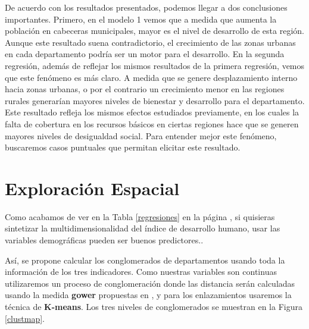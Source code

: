 \documentclass{article}
\begin{document}
De acuerdo con los resultados presentados, podemos llegar a dos conclusiones importantes. Primero, en el modelo 1 vemos que a medida que aumenta la población en cabeceras municipales, mayor es el nivel de desarrollo de esta región. Aunque este resultado suena contradictorio, el crecimiento de las zonas urbanas en cada departamento podría ser un motor para el desarrollo. En la segunda regresión, además de reflejar los mismos resultados de la primera regresión, vemos que este fenómeno es más claro. A medida que se genere desplazamiento interno hacia zonas urbanas, o por el contrario un crecimiento menor en las regiones rurales generarían mayores niveles de bienestar y desarrollo para el departamento. Este resultado refleja los mismos efectos estudiados previamente, en los cuales la falta de cobertura en los recursos básicos en ciertas regiones hace que se generen mayores niveles de desigualdad social. Para entender mejor este fenómeno, buscaremos casos puntuales que permitan elicitar este resultado.

\clearpage

\section{Exploración Espacial}\label{espacial}


Como acabamos de ver en la Tabla \ref{regresiones} en la página \pageref{regresiones}, si quisieras sintetizar la multidimensionalidad del índice de desarrollo humano, usar las variables demográficas pueden ser buenos predictores.. 

Así, se propone calcular los conglomerados de departamentos usando toda la información de los tres indicadores. Como nuestras variables son continuas utilizaremos un proceso de conglomeración donde las distancia serán calculadas usando la medida {\bf gower} propuestas en \cite{macqueen_methods_nodate}, y para los enlazamientos usaremos la técnica de {\bf K-means}. Los tres niveles de conglomerados se muestran en la Figura \ref{clustmap}.
\end{document}
